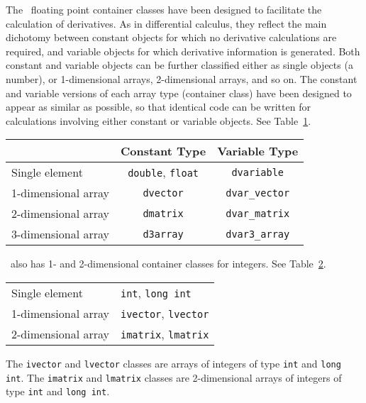 \documentclass{admbmanual}
\begin{document}
The \scAD\ floating point container classes have been designed to facilitate the
calculation of derivatives. As in differential calculus, they reflect the main
dichotomy between constant objects for which no derivative calculations are
required, and variable objects for which derivative information is generated.
Both constant and variable objects can be further classified either as single
objects (a number), or 1-dimensional arrays, 2-dimensional arrays, and so on.
The constant and variable versions of each array type (container class) have
been designed to appear as similar as possible, so that identical code can be
written for calculations involving either constant or variable objects. See
Table~\ref{tab:types}.
\begin{table}[!h]
\begin{center}
\begin{tabular}{@{\vrule height 12pt depth7pt width0pt} l  |  c  |  c }
 \hline
 & \bf Constant Type & \bf Variable Type \\
 \hline
Single element&\texttt{double}, \texttt{float}&\texttt{dvariable} \\
1-dimensional array&\texttt{dvector}&\texttt{dvar\_vector} \\
2-dimensional array&\texttt{dmatrix}&\texttt{dvar\_matrix} \\
3-dimensional array&\texttt{d3array}&\texttt{dvar3\_array} \\[3pt]
\hline
\end{tabular}
\end{center}
\emptycaption
\label{tab:types}
\end{table}

\scAD\ also has 1- and 2-dimensional container classes for integers. See
Table~\ref{tab:integer-container-classes}.
\begin{table}[!h]
\begin{center}
\begin{tabular}{@{\vrule height 12pt depth7pt width0pt}  l  |  l }
\hline
Single element&\texttt{int}, \texttt{long int} \\
1-dimensional array&\texttt{ivector}, \texttt{lvector} \\
2-dimensional array&\texttt{imatrix}, \texttt{lmatrix} \\
\hline
\end{tabular}
\end{center}
\emptycaption
\label{tab:integer-container-classes}
\end{table}

The \texttt{ivector} and \texttt{lvector} classes are arrays of integers of type
\texttt{int} and \texttt{long int}. The \texttt{imatrix} and \texttt{lmatrix}
classes are 2-dimensional arrays of integers of type \texttt{int} and
\texttt{long~int}.
\end{document}
